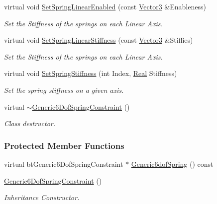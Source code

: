 \begin{DoxyCompactItemize}
virtual void \hyperlink{classMezzanine_1_1Generic6DofSpringConstraint_aa166925f112f031ab8927d6a2af4f938}{SetSpringLinearEnabled} (const \hyperlink{classMezzanine_1_1Vector3}{Vector3} \&Enableness)
\begin{DoxyCompactList}\small\item\em Set the Stiffness of the springs on each Linear Axis. \item\end{DoxyCompactList}\item 
virtual void \hyperlink{classMezzanine_1_1Generic6DofSpringConstraint_a1ad3bbe259be7d902b299568bd583cbd}{SetSpringLinearStiffness} (const \hyperlink{classMezzanine_1_1Vector3}{Vector3} \&Stiffies)
\begin{DoxyCompactList}\small\item\em Set the Stiffness of the springs on each Linear Axis. \item\end{DoxyCompactList}\item 
virtual void \hyperlink{classMezzanine_1_1Generic6DofSpringConstraint_ac3399694dcabcf63a4e475b4d3537e2b}{SetSpringStiffness} (int Index, \hyperlink{namespaceMezzanine_a726731b1a7df72bf3583e4a97282c6f6}{Real} Stiffness)
\begin{DoxyCompactList}\small\item\em Set the spring stiffness on a given axis. \item\end{DoxyCompactList}\item 
virtual \hyperlink{classMezzanine_1_1Generic6DofSpringConstraint_ab64568bca388b19c4b81ff6bd8c6dc38}{$\sim$Generic6DofSpringConstraint} ()
\begin{DoxyCompactList}\small\item\em Class destructor. \item\end{DoxyCompactList}\end{DoxyCompactItemize}
\subsubsection*{Protected Member Functions}
\begin{DoxyCompactItemize}
\item 
virtual btGeneric6DofSpringConstraint $\ast$ \hyperlink{classMezzanine_1_1Generic6DofSpringConstraint_ac57671613502a67f7b5135ba947f7e9d}{Generic6dofSpring} () const 
\item 
\hyperlink{classMezzanine_1_1Generic6DofSpringConstraint_acd643a162aba9452cd10660a89d7acf7}{Generic6DofSpringConstraint} ()
\begin{DoxyCompactList}\small\item\em Inheritance Constructor. \item\end{DoxyCompactList}\end{DoxyCompactItemize}


